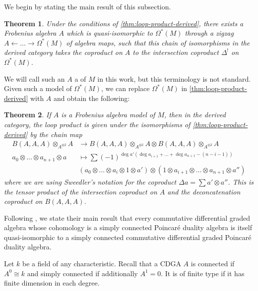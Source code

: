 \documentclass{scrartcl}
\let\emph\relax
\theoremstyle{plain}
\newtheorem{theorem}{Theorem}[section]
\theoremstyle{definition}
\newcommand{\iso}{\cong}
\newcommand{\from}{\leftarrow}
\begin{document}
We begin by stating the main result of this subsection. 
\begin{theorem}
    Under the conditions of \cref{thm:loop-product-derived}, there exists a Frobenius algebra $A$ which is quasi-isomorphic to $\Omega^*(M)$ through a zigzag $A\from \dots\to \Omega^*(M)$ of algebra maps, such that this chain of isomorphisms in the derived category takes the coproduct on $A$ to the intersection coproduct $\Delta^!$ on $\Omega^*(M)$. 
\end{theorem}

We will call such an $A$ a \emph{Frobenius algebra model} of $M$ in this work, but this terminology is not standard. Given such a model of $\Omega^*(M)$, we can replace $\Omega^*(M)$ in \cref{thm:loop-product-derived} with $A$ and obtain the following:

\begin{theorem}
    If $A$ is a Frobenius algebra model of $M$, then in the derived category, the loop product is given under the isomorphisms of \cref{thm:loop-product-derived} by the chain map
    \begin{align*}
        B(A, A, A)\otimes_{A^{\otimes 2}} A &\to B(A, A, A)\otimes_{A^{\otimes 2}} A \otimes B(A, A, A)\otimes_{A^{\otimes 2}} A \\
        a_0\otimes\dots \otimes a_{n+1}\otimes a &\mapsto \sum(-1)^{\deg a'(\deg a_{i+1}+\dots+\deg a_{n+1} - (n-i-1))}\\
        \qquad& (a_0 \otimes\dots\otimes a_i \otimes 1 \otimes a')\otimes (1\otimes a_{i+1}\otimes\dots\otimes a_{n+1}\otimes a'')
    \end{align*}
    where we are using Sweedler's notation for the coproduct $\Delta a = \sum a'\otimes a''$. This is the tensor product of the intersection coproduct on $A$ and the deconcatenation coproduct on $B(A, A, A)$.
\end{theorem}

Following \cite{lambrechts2008poincare}, we state their main result that every commutative differential graded algebra whose cohomology is a simply connected Poincaré duality algebra is itself quasi-isomorphic to a simply connected commutative differential graded Poincaré duality algebra.

Let $k$ be a field of any characteristic. Recall that a CDGA $A$ is connected if $A^0 \iso k$ and simply connected if additionally $A^1 = 0$. It is of finite type if it has finite dimension in each degree. 
\end{document}
